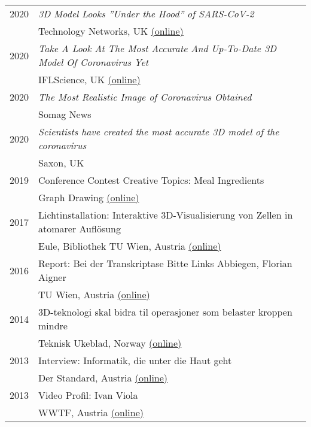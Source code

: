 \documentclass[a4paper,11pt]{letter}
\begin{document}
\begin{tabular}{l| l}
2020 & \emph{3D Model Looks ''Under the Hood'' of SARS-CoV-2} \\
 & Technology Networks, UK \href{https://www.technologynetworks.com/informatics/news/3d-model-looks-under-the-hood-of-sars-cov-2-342626}{(online)}\\
2020 & \emph{Take A Look At The Most Accurate And Up-To-Date 3D Model Of Coronavirus Yet} \\
 & IFLScience, UK \href{https://www.iflscience.com/take-a-look-at-the-most-accurate-and-uptodate-3d-model-of-coronavirus-yet-57737}{(online)}\\ 
2020 & \emph{The Most Realistic Image of Coronavirus Obtained} \\
 & Somag News \\
2020 & \emph{Scientists have created the most accurate 3D model of the coronavirus} \\
 & Saxon, UK \\
2019 & Conference Contest Creative Topics: Meal Ingredients\\
 & Graph Drawing \href{https://mozart.diei.unipg.it/gdcontest/contest2019/results.html#meals}{(online)}\\
2017 & Lichtinstallation: Interaktive 3D-Visualisierung von Zellen in atomarer Auflösung\\
 &  Eule, Bibliothek TU Wien, Austria \href{https://www.cg.tuwien.ac.at/news/2017-11-23-TU-Bibliothek-Eulenstatue-Die-Bausteine-des-Lebens-im-Scheinwerferlicht}{(online)}\\
2016 & Report: Bei der Transkriptase Bitte Links Abbiegen, Florian Aigner\\
 & TU Wien, Austria \href{https://www.tuwien.at/tu-wien/aktuelles/ausgezeichnetes/news/bei-der-transkriptase-bitte-links-abbiegen}{(online)}\\
2014 & 3D-teknologi skal bidra til operasjoner som belaster kroppen mindre\\
 & Teknisk Ukeblad, Norway \href{https://www.tu.no/artikler/3d-teknologi-skal-bidra-til-operasjoner-som-belaster-kroppen-mindre/231131}{(online)}\\
2013 & Interview: Informatik, die unter die Haut geht\\
 & Der Standard, Austria \href{https://www.derstandard.at/consent/tcf/story/1363708196058/informatik-die-unter-die-haut-geht}{(online)}\\
2013 & Video Profil: Ivan Viola\\
 & WWTF, Austria \href{http://www.1060film.com/kunden/wwtf/portraits/}{(online)}\\
\hline
\end{tabular}
\end{document}

